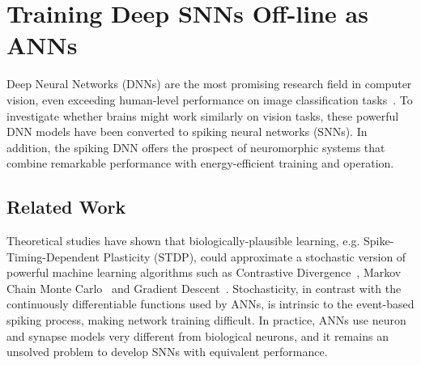 \chapter{Training Deep SNNs Off-line as ANNs}
\label{cha:Conv}


Deep Neural Networks (DNNs) are the most promising research field in computer vision, even exceeding human-level performance on image classification tasks~\cite{he2015delving}.
	To investigate whether brains might work similarly on vision tasks, these powerful DNN models have been converted to spiking neural networks (SNNs).
	In addition, the spiking DNN offers the prospect of neuromorphic systems that combine remarkable performance with energy-efficient training and operation.
\section{Related Work}	
	Theoretical studies have shown that biologically-plausible learning, e.g. Spike-Timing-Dependent Plasticity (STDP), could approximate a stochastic version of powerful machine learning algorithms
	such as 
	Contrastive Divergence~\cite{neftci2013event}, Markov Chain Monte Carlo~\cite{buesing2011neural} and Gradient Descent~\cite{o2016deep}.
	Stochasticity, in contrast with the continuously differentiable functions used by ANNs, is intrinsic to the event-based spiking process, making network training difficult.
	In practice, ANNs use neuron and synapse models very different from biological neurons, and it remains an unsolved problem to develop SNNs with equivalent performance.
	
	
